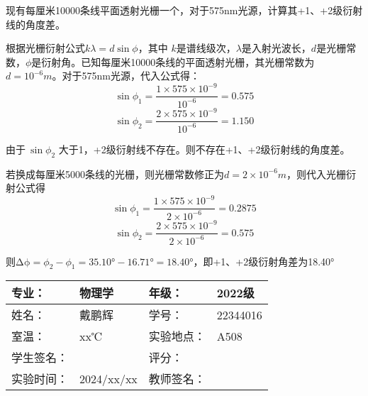 \documentclass[dvipsnames, svgnames,a4paper,11pt]{article}
\begin{document}
%	
%	

\begin{question}
	现有每厘米10000条线平面透射光栅一个，对于575nm光源，计算其+1、+2级衍射线的角度差。
\end{question}
	根据光栅衍射公式$k\lambda=d\sin{\phi}$，其中 $k$是谱线级次，$\lambda$是入射光波长，$d$是光栅常数，$\phi$是衍射角。已知每厘米10000条线的平面透射光栅，其光栅常数为 $d={10}^{-6}m$。对于575nm光源，代入公式得：
	\[ \sin{\phi_1}=\frac{1\times575\times{10}^{-9}}{{10}^{-6}}=0.575 \]
	\[ \sin{\phi_2}=\frac{2\times575\times{10}^{-9}}{{10}^{-6}}=1.150 \]
	
	由于$\ \sin{\phi_2}$ 大于1，+2级衍射线不存在。则不存在+1、+2级衍射线的角度差。
	
	若换成每厘米5000条线的光栅，则光栅常数修正为$ d=2\times{10}^{-6}m$，则代入光栅衍射公式得
	\[ \sin{\phi_1}=\frac{1\times575\times{10}^{-9}}{2\times{10}^{-6}}=0.2875 \]
	\[ \sin{\phi_2}=\frac{2\times575\times{10}^{-9}}{2\times{10}^{-6}}=0.575 \]
	
	则$\mathrm{\Delta\phi}=\phi_2-\phi_1=35.10°-16.71°=18.40°$，即+1、+2级衍射角差为18.40°


\clearpage
\begin{table}
	\renewcommand\arraystretch{1.7}
	\centering
	\begin{tabularx}{\textwidth}{|X|X|X|X|}
	\hline
	专业：& 物理学 &年级：& 2022级 \\
	\hline
	姓名：& 戴鹏辉 & 学号：& 22344016 \\
	\hline
	室温：& xx℃ & 实验地点： & A508 \\
	\hline
	学生签名：& & 评分： &\\
	\hline
	实验时间：& 2024/xx/xx & 教师签名：&\\
	\hline
	\end{tabularx}
\end{table}
\end{document}
